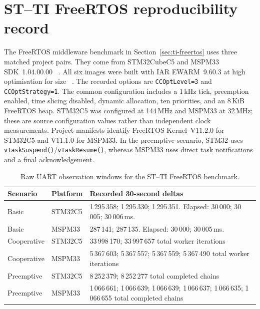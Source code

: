 \section{ST--TI FreeRTOS reproducibility record}
\label{sec:appendix-ti-freertos}

The FreeRTOS middleware benchmark in Section~\ref{sec:ti-freertos} uses three matched
project pairs. They come from STM32CubeC5 and MSPM33 SDK~1.04.00.00
~\cite{stm32cubec5-sw,ti-mspm33-sdk}.
All six images were built with IAR EWARM~9.60.3 at high optimisation for size
~\cite{iar-ewarm}. The recorded options are \texttt{CCOptLevel=3} and
\texttt{CCOptStrategy=1}. The common configuration
includes a 1\,kHz tick, preemption enabled, time slicing disabled, dynamic allocation, ten
priorities, and an 8\,KiB FreeRTOS heap. STM32C5 was configured at 144\,MHz and MSPM33 at
32\,MHz; these are source configuration values rather than independent clock measurements.
Project manifests identify FreeRTOS Kernel~V11.2.0 for STM32C5 and V11.1.0 for MSPM33. In the
preemptive scenario, STM32 uses \texttt{vTaskSuspend()}/\texttt{vTaskResume()}, whereas MSPM33
uses direct task notifications and a final acknowledgement.

\begin{table}[H]
\centering
\caption{Raw UART observation windows for the ST--TI FreeRTOS benchmark.}
\label{tab:appendix-ti-freertos-runtime}
\small
\begin{tabularx}{\textwidth}{l l X}
\toprule
\textbf{Scenario} & \textbf{Platform} & \textbf{Recorded 30-second deltas} \\
\midrule
Basic & STM32C5 & 1\,295\,358; 1\,295\,330; 1\,295\,351. Elapsed: 30\,000; 30\,005; 30\,006\,ms. \\
Basic & MSPM33 & 287\,141; 287\,135. Elapsed: 30\,000; 30\,005\,ms. \\
Cooperative & STM32C5 & 33\,998\,170; 33\,997\,657 total worker iterations \\
Cooperative & MSPM33 & 5\,367\,603; 5\,367\,557; 5\,367\,559; 5\,367\,490 total worker iterations \\
Preemptive & STM32C5 & 8\,252\,379; 8\,252\,277 total completed chains \\
Preemptive & MSPM33 & 1\,066\,661; 1\,066\,639; 1\,066\,639; 1\,066\,637; 1\,066\,635; 1\,066\,655 total completed chains \\
\bottomrule
\end{tabularx}
\end{table}


